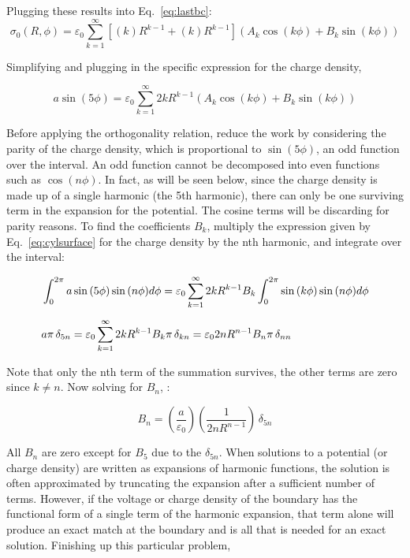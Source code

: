 \documentclass[12pt]{article}
\begin{document}
\begin{flushleft}
Plugging these results into Eq.~\ref{eq:lastbc}: 
\begin{equation*}
\sigma_{0}(R,\phi) = \varepsilon_{0} \sum_{k=1}^{\infty} \left[ (k) R^{k-1}  + (k) R^{k-1} \right] ( A_{k} \cos{(k\phi)}+B_{k}\sin{(k\phi)} ) 
\end{equation*}

Simplifying and plugging in the specific expression for the charge density,

\begin{equation}
a\sin{(5\phi)} = \varepsilon_{0} \sum_{k=1}^{\infty} 2kR^{k-1} ( A_{k} \cos{(k\phi)}+B_{k}\sin{(k\phi)} ) 
\label{eq:cylsurface}
\end{equation}

Before applying the orthogonality relation, reduce the work by considering the parity of the charge density, which is proportional to $\sin{(5\phi)}$, an odd function over the interval.  An odd function cannot be decomposed into even functions such as $\cos{(n\phi)}$.  In fact, as will be seen below, since the charge density is made up of a single harmonic (the 5th harmonic), there can only be one surviving term in the expansion for the potential.  The cosine terms will be discarding for parity reasons.  To find the coefficients $B_{k}$, multiply the expression given by Eq.~\ref{eq:cylsurface} for the charge density by the nth harmonic, and integrate over the interval:

\begin{align}
& \int_{0}^{2\pi} a\sin{(5\phi)}\sin{(n\phi)} d\phi = \varepsilon_{0} \sum_{k=1}^{\infty} 2kR^{k-1} B_{k} \int_{0}^{2\pi} \sin{(k\phi)} \sin{(n\phi)} d\phi \notag \\[6pt]
& a\pi \, \delta_{5n} = \varepsilon_{0} \sum_{k=1}^{\infty} 2kR^{k-1} B_{k} \pi \, \delta_{kn} =  \varepsilon_{0} 2nR^{n-1} B_{n} \pi \, \delta_{nn} 
\end{align}

Note that only the nth term of the summation survives, the other terms are zero since $k\ne n$.  Now solving for $B_{n}$, :

\begin{equation}
B_{n} = \left( \frac{a}{\varepsilon_{0}} \right) \left( \frac{1}{2nR^{n-1}} \right) \, \delta_{5n} 
\label{eq:deltas}
\end{equation}

All $B_{n}$ are zero except for $B_{5}$ due to the $\delta_{5n}$.   When solutions to a potential (or charge density) are written as expansions of harmonic functions, the solution is often approximated by truncating the expansion after a sufficient number of terms.  However, if the voltage or charge density of the boundary has the functional form of a single term of the harmonic expansion, that term alone will produce an exact match at the boundary and is all that is needed for an exact solution.  Finishing up this particular problem, 


\end{flushleft}
\end{document}
